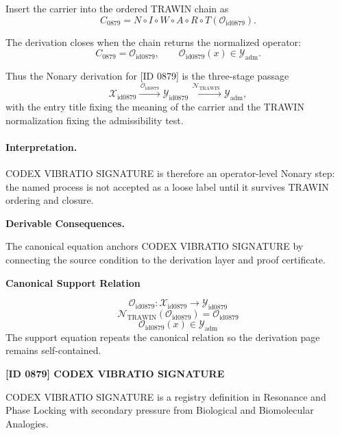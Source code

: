 Insert the carrier into the ordered TRAWIN chain as\[
C_{0879}=N\circ I\circ W\circ A\circ R\circ T(\mathcal{O}_{\mathrm{id0879}}).
\]

The derivation closes when the chain returns the normalized operator:\[
C_{0879}=\mathcal{O}_{\mathrm{id0879}},\qquad \mathcal{O}_{\mathrm{id0879}}(x)\in\mathcal{Y}_{\mathrm{adm}}.
\]

Thus the Nonary derivation for [ID 0879] is the three-stage passage
\[
\mathcal{X}_{\mathrm{id0879}}\xrightarrow{\,\mathcal{O}_{\mathrm{id0879}}\,} \mathcal{Y}_{\mathrm{id0879}}\xrightarrow{\,\mathcal{N}_{\mathrm{TRAWIN}}\,} \mathcal{Y}_{\mathrm{adm}},
\]
with the entry title fixing the meaning of the carrier and the TRAWIN normalization fixing the admissibility test.

\paragraph{Interpretation.} CODEX VIBRATIO SIGNATURE is therefore an operator-level Nonary step: the named process is not accepted as a loose label until it survives TRAWIN ordering and closure.

\par\vspace{0.35em}
\noindent\textbf{Derivable Consequences.}\quad
\begingroup
\footnotesize
\raggedright
The canonical equation anchors CODEX VIBRATIO SIGNATURE by connecting the source condition to the derivation layer and proof certificate.
\par\endgroup

\noindent\textbf{Canonical Support Relation}\par
\[
\mathcal{O}_{\mathrm{id0879}}:\mathcal{X}_{\mathrm{id0879}}\longrightarrow\mathcal{Y}_{\mathrm{id0879}}
\]
\[
\mathcal{N}_{\mathrm{TRAWIN}}(\mathcal{O}_{\mathrm{id0879}})=\mathcal{O}_{\mathrm{id0879}}
\]
\[
\mathcal{O}_{\mathrm{id0879}}(x)\in\mathcal{Y}_{\mathrm{adm}}
\]
\noindent The support equation repeats the canonical relation so the derivation page remains self-contained.\par

\clearpage
\noindent\textbf{[ID 0879] CODEX VIBRATIO SIGNATURE}\par
\vspace{0.35em}
\begingroup\small
{}
CODEX VIBRATIO SIGNATURE is a registry definition in Resonance and Phase Locking with secondary pressure from Biological and Biomolecular Analogies.

